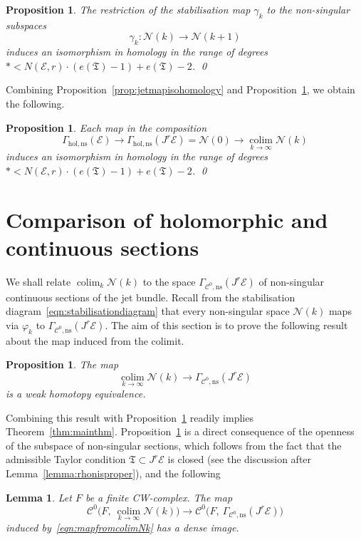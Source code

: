\documentclass[a4paper]{amsart}
\newcommand{\cE}{\mathcal E}
\newcommand{\cC}{\mathcal C}
\newcommand{\cN}{\mathcal N}
\newcommand{\fT}{\mathfrak T}
\newcommand{\lra}{\longrightarrow}
\DeclareMathOperator*{\colim}{colim}
\theoremstyle{plain}
\newtheorem{proposition}[theorem]{Proposition}
\newtheorem{lemma}[theorem]{Lemma}
\theoremstyle{definition}
\begin{document}
\begin{proposition}\label{prop:stabilisationisohomology}
The restriction of the stabilisation map $\gamma_k$ to the non-singular subspaces
\[
    \gamma_k \colon \cN(k) \lra \cN(k+1)
\]
induces an isomorphism in homology in the range of degrees $* < N(\cE,r)\cdot (e(\fT)-1) + e(\fT) - 2$. \qed
\end{proposition}

Combining Proposition~\ref{prop:jetmapisohomology} and Proposition~\ref{prop:stabilisationisohomology}, we obtain the following.
\begin{proposition}\label{prop:combinedisohomology}
Each map in the composition
\[
    \Gamma_{\mathrm{hol,ns}}(\cE) \lra \Gamma_{\mathrm{hol,ns}}(J^r\cE) = \cN(0) \lra \colim\limits_{k \to \infty} \cN(k)
\]
induces an isomorphism in homology in the range of degrees $* < N(\cE,r)\cdot (e(\fT)-1) + e(\fT) - 2$. \qed
\end{proposition}



\section{Comparison of holomorphic and continuous sections}\label{section:holcontinuouscompare}


We shall relate $\colim_k \cN(k)$ to the space  $\Gamma_{\cC^0, \mathrm{ns}}\left(J^r\cE\right)$ of non-singular continuous sections of the jet bundle. Recall from the stabilisation diagram~\eqref{eqn:stabilisationdiagram} that every non-singular space $\cN(k)$ maps via $\varphi_k$ to $\Gamma_{\cC^0, \mathrm{ns}}\left(J^r\cE\right)$. The aim of this section is to prove the following result about the map induced from the colimit.

\begin{proposition}\label{prop:weakequivalence}
The map 
\begin{equation}\label{eqn:mapfromcolimNk}
    \colim\limits_{k \to \infty} \cN(k) \lra \Gamma_{\cC^0, \mathrm{ns}}\left(J^r\cE\right)
\end{equation}
is a weak homotopy equivalence.
\end{proposition}

Combining this result with Proposition~\ref{prop:combinedisohomology} readily implies Theorem~\ref{thm:mainthm}. Proposition~\ref{prop:weakequivalence} is a direct consequence of the openness of the subspace of non-singular sections, which follows from the fact that the admissible Taylor condition $\fT \subset J^r\cE$ is closed (see the discussion after Lemma~\ref{lemma:rhonisproper}), and the following
\begin{lemma}\label{lemma:densitylemma}
Let $F$ be a finite CW-complex. The map
\[
    \cC^0\big(F, \ \colim\limits_{k \to \infty} \cN(k)\big) \lra \cC^0\big(F, \ \Gamma_{\cC^0, \mathrm{ns}}\left(J^r\cE\right)  \big)
\]
induced by~\eqref{eqn:mapfromcolimNk} has a dense image.
\end{lemma}
\end{document}
